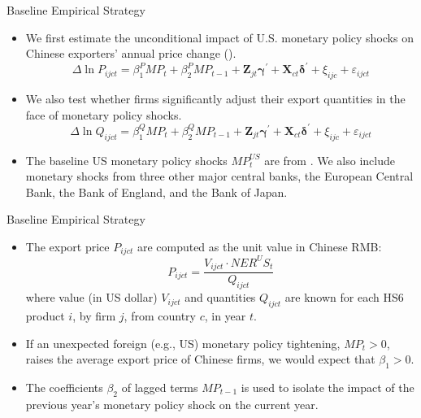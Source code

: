 \documentclass[10pt]{beamer}
\begin{document}
\begin{frame}{Baseline Empirical Strategy}
    \begin{itemize}
        \item We first estimate the unconditional impact of U.S. monetary policy shocks on Chinese exporters' annual price change (\cite{lmx2015}).
        \begin{equation}
	   \Delta \ln P_{i j c t}=\beta^P_1 M P_{t} + \beta^P_2 M P_{t-1}+ \mathbf{Z}_{jt} \boldsymbol{\gamma}^{\prime}+\mathbf{X}_{ct} \boldsymbol{\delta}^{\prime} +\xi_{i j c} + \varepsilon_{ijct}
	\label{eq.baseline}
        \end{equation}
        \item We also test whether firms significantly adjust their export quantities in the face of monetary policy shocks.
        \begin{equation}
	   \Delta \ln Q_{i j c t}=\beta^Q_1 M P_{t} + \beta^Q_2 M P_{t-1}+ \mathbf{Z}_{jt} \boldsymbol{\gamma}^{\prime}+\mathbf{X}_{ct} \boldsymbol{\delta}^{\prime} +\xi_{i j c} + \varepsilon_{ijct}
	\label{eq.quantity}
        \end{equation}
        \item The baseline US monetary policy shocks $MP^{US}_t$ are from \cite{brw2021}. We also include monetary shocks from three other major central banks, the European Central Bank, the Bank of England, and the Bank of Japan.
    \end{itemize}
\end{frame}

\begin{frame}{Baseline Empirical Strategy}
    \begin{itemize} 
        \item The export price $P_{i j c t}$ are computed as the unit value in Chinese RMB:
    		$$
    		P_{ijct}=\frac{V_{ijct}\cdot NER^US_{t}}{Q_{ijct}}
    		$$
            where value (in US dollar) $V_{ijct}$ and quantities $Q_{ijct}$ are known for each HS6 product $i$, by firm $j$, from country $c$, in year $t$.
        \item If an unexpected foreign (e.g., US) monetary policy tightening, $MP_t > 0$, raises the average export price of Chinese firms, we would expect that $\beta_1 > 0$.
        \item The coefficients $\beta_2$ of lagged terms $MP_{t-1}$ is used to isolate the impact of the previous year's monetary policy shock on the current year.
    \end{itemize}
\end{frame}
\end{document}
